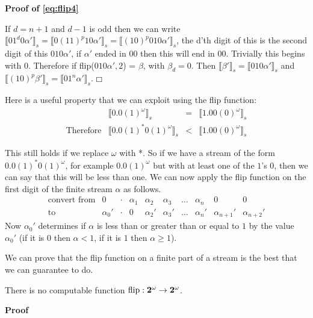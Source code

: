 \documentclass{cs4rep}
\begin{document}
{\bf Proof of \ref{eq:flip4} }

If $d=n+1$ and $d-1$ is odd then we can write $ \llbracket
01^{d}0\alpha' \rrbracket_{s} = \llbracket 0(11)^{p}10 \alpha'
\rrbracket_{s} = \llbracket (10)^{p}010\alpha' \rrbracket_{s}$, the
d'th digit of this is the second digit of this $010\alpha'$, if
$\alpha'$ ended in 00 then this will end in 00. Trivially this begins
with 0. Therefore if flip($010\alpha', 2$) = $\beta$, with $\beta_{d}
=0$. Then $\llbracket \beta' \rrbracket_{s} = \llbracket 010\alpha'
\rrbracket_{s}$ and $ \llbracket (10)^{p}\beta' \rrbracket_{s} =
\llbracket 01^{n}\alpha' \rrbracket_{s} $. \hfill $\boxempty$

Here is a useful property that we can exploit using the flip function:
\[ \begin{array}{lrcl}
 & \llbracket 0.0(1)^{\omega} \rrbracket_{s} & = & \llbracket 1.00(0)^{\omega} \rrbracket_{s} \\
 \mbox{Therefore} & \llbracket 0.0(1)^{*}0(1)^{\omega} \rrbracket_{s} & < & \llbracket 1.00(0)^{\omega} \rrbracket_{s}
 \end{array}\]
 
 This still holds if we replace $\omega$ with *. So if we have a
 stream of the form $0.0(1)^{*}0(1)^{\omega}$, for example
 $0.0(1)^{\omega}$ but with at least one of the $1$'s $0$, then we can
 say that this will be less than one.  We can now apply the flip
 function on the first digit of the finite stream $\alpha$ as follows.
\[ \begin{array}{lrllllllll}
\mbox{convert from} & 0 & \cdot & \alpha_{1} & \alpha_{2} & \alpha_{3} & \ldots & \alpha_{n} & 0 & 0 \\
\mbox{to} & \alpha_{0}' & \cdot & 0 & \alpha_{2}' & \alpha_{3}' & \ldots & \alpha_{n}' & \alpha_{n+1}' & \alpha_{n+2}'
\end{array} \]
Now $\alpha_{0}'$ determines if $\alpha$ is less than or greater than or equal to $1$ by the value $\alpha_{0}'$ (if it is $0$ then $\alpha < 1$, if it is $1$ then $\alpha \geq 1$). 

We can prove that the flip function on a finite part of a stream is
the best that we can guarantee to do.

\begin{myprop}
There is no computable function $\mbox{flip}:{\bf 2^{\omega} \rightarrow 2^{\omega}}$.
\end{myprop}

{\bf Proof}
\end{document}
